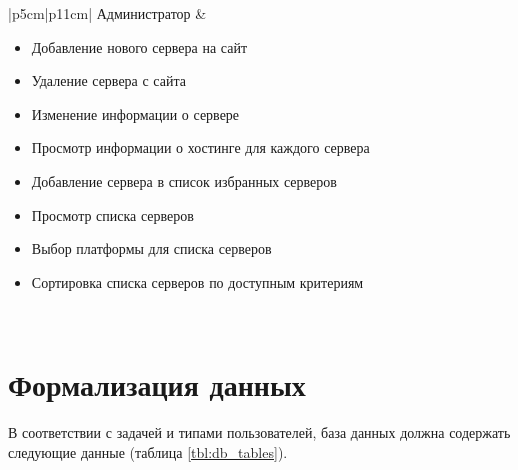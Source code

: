 \begin{center}
\begin{longtable}[c]{|p{5cm}|p{11cm}|}
        Администратор &
            \begin{minipage}[t]{\linewidth}
                \begin{itemize}[nosep,after=\strut]
                    \item Добавление нового сервера на сайт
                    \item Удаление сервера с сайта
                    \item Изменение информации о сервере
                    \item Просмотр информации о хостинге для каждого сервера
                    \item Добавление сервера в список избранных серверов
                    \item Просмотр списка серверов
                    \item Выбор платформы для списка серверов
                    \item Сортировка списка серверов по доступным критериям
                \end{itemize}
            \end{minipage} 
        \\ \hline
\end{longtable}
\end{center}


\section{Формализация данных}

В соответствии с задачей и типами пользователей, база данных должна содержать следующие данные (таблица \ref{tbl:db_tables}).

